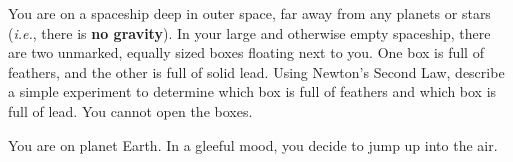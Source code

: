 \begin{questions}
\qsp

\question[2] 
\qsp
{}

\question[3] You are on a spaceship deep in outer space, far away from any planets or stars (\textit{i.e.}, there is \textbf{no gravity}). In your large and otherwise empty spaceship, there are two unmarked, equally sized boxes floating next to you. One box is full of feathers, and the other is full of solid lead. Using Newton’s Second Law, describe a simple experiment to determine which box is full of feathers and which box is full of lead. You cannot open the boxes. 

\qspppp
\qsp


\question[2] You are on planet Earth. In a gleeful mood, you decide to jump up into the air. 

\qspppp



\qsp

\newpage
{}


\end{questions}
